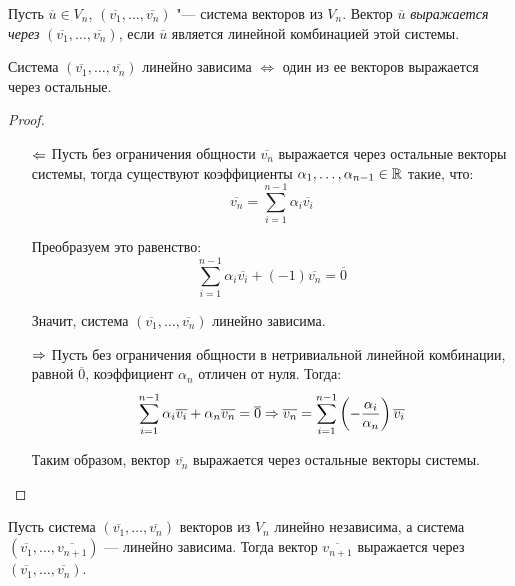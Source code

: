 \begin{definition}
	Пусть $\overline{u} \in V_n$, $(\overline{v_1}, \dots, \overline{v_n})$ "--- система векторов из $V_n$. Вектор $\overline{u}$ \textit{выражается через} $(\overline{v_1}, \dots, \overline{v_n})$, если $\overline{u}$ является линейной комбинацией этой системы.
\end{definition}

\begin{proposition}
	Система $(\overline{v_1}, \dots, \overline{v_n})$ линейно зависима $\Leftrightarrow$ один из ее векторов выражается через остальные.
\end{proposition}

\begin{proof}~
	\begin{itemize}
		\item[$\Leftarrow$] Пусть без ограничения общности $\overline{v_n}$ выражается через остальные векторы системы, тогда существуют коэффициенты $\alpha_1, \dotsc, \alpha_{n-1} \in \mathbb{R}$ такие, что:
		\pagebreak
		\[\overline{v_n} = \sum_{i = 1}^{n - 1}\alpha_i\overline{v_i}\]
		
		Преобразуем это равенство:
		\[\sum_{i = 1}^{n - 1}\alpha_i\overline{v_i} + (-1)\overline{v_n} = \overline{0}\]
		
		Значит, система $(\overline{v_1}, \dotsc, \overline{v_n})$ линейно зависима.
		
		\item[$\Rightarrow$] Пусть без ограничения общности в нетривиальной линейной комбинации, равной $\overline{0}$, коэффициент $\alpha_n$ отличен от нуля. Тогда:
		\[\sum_{i = 1}^{n - 1}\alpha_i\overline{v_i} + \alpha_n\overline{v_n} = \overline{0} \Rightarrow
		\overline{v_n} = \sum_{i = 1}^{n - 1}\left(-\frac{\alpha_i}{\alpha_n}\right)\overline{v_i}\]
			
		Таким образом, вектор $\overline{v_n}$ выражается через остальные векторы системы. \qedhere
	\end{itemize}
 
\end{proof}

\begin{proposition}
	Пусть система $(\overline{v_1}, \dots, \overline{v_n})$ векторов из $V_n$ линейно независима, а система $(\overline{v_1}, \dots, \overline{v_{n + 1}})$ --- линейно зависима. Тогда вектор $\overline{v_{n + 1}}$ выражается через $(\overline{v_1}, \dots, \overline{v_n})$.
\end{proposition}

